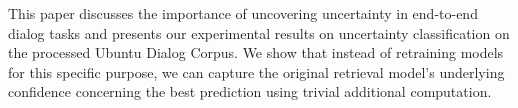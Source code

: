 This paper discusses the importance of uncovering uncertainty in end-to-end dialog tasks and presents our experimental results on uncertainty classification on the processed Ubuntu Dialog Corpus. We show that instead of retraining models for this specific purpose, we can capture the original retrieval model's underlying confidence concerning the best prediction using trivial additional computation.
